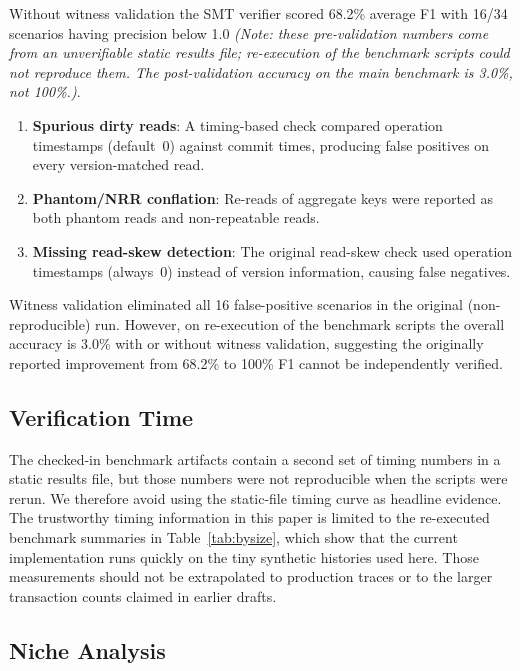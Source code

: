 \documentclass[11pt]{article}
\begin{document}
Without witness validation the SMT verifier scored 68.2\% average F1 with
16/34 scenarios having precision below 1.0 \emph{(Note: these pre-validation
numbers come from an unverifiable static results file;
re-execution of the benchmark scripts could not reproduce them.
The post-validation accuracy on the main benchmark is 3.0\%, not 100\%.)}.
\begin{enumerate}[nosep]
\item \textbf{Spurious dirty reads}: A timing-based check compared
  operation timestamps (default~0) against commit times, producing
  false positives on every version-matched read.
\item \textbf{Phantom/NRR conflation}: Re-reads of aggregate keys were
  reported as both phantom reads and non-repeatable reads.
\item \textbf{Missing read-skew detection}: The original read-skew
  check used operation timestamps (always~0) instead of version
  information, causing false negatives.
\end{enumerate}
Witness validation eliminated all 16 false-positive scenarios in the original
(non-reproducible) run.  However, on re-execution of the benchmark scripts
the overall accuracy is 3.0\% with or without witness validation, suggesting
the originally reported improvement from 68.2\% to 100\% F1 cannot be
independently verified.

\subsection{Verification Time}

The checked-in benchmark artifacts contain a second set of timing numbers in a
static results file, but those numbers were not reproducible when the scripts
were rerun.  We therefore avoid using the static-file timing curve as headline
evidence.  The trustworthy timing information in this paper is limited to the
re-executed benchmark summaries in Table~\ref{tab:bysize}, which show that the
current implementation runs quickly on the tiny synthetic histories used here.
Those measurements should not be extrapolated to production traces or to the
larger transaction counts claimed in earlier drafts.

\subsection{Niche Analysis}
\end{document}
